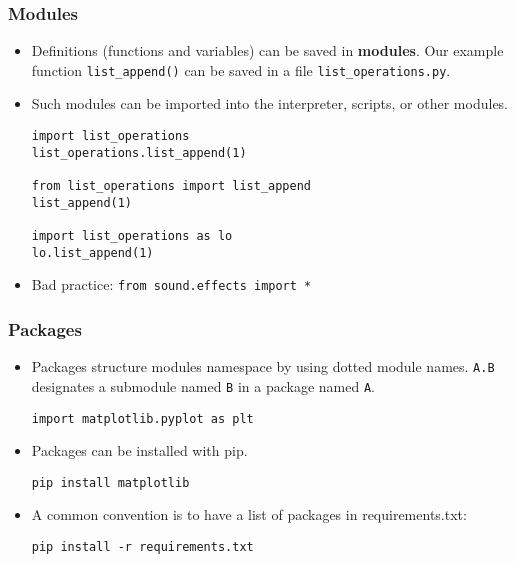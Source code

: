 \begin{frame}[fragile]
    \frametitle{Modules}
    \begin{itemize}
        \item Definitions (functions and variables) can be saved in
        \textbf{modules}. Our example function
        \texttt{list_append()} can be saved in a file
        \texttt{list_operations.py}.
        \item Such modules can be imported into the interpreter,
        scripts, or other modules.
\begin{verbatim}
import list_operations
list_operations.list_append(1)

from list_operations import list_append
list_append(1)

import list_operations as lo
lo.list_append(1)
\end{verbatim}
        \item Bad practice: \texttt{from sound.effects import *}
    \end{itemize}
\end{frame}

\begin{frame}
    \frametitle{Packages}
    \begin{itemize}
        \item Packages structure modules namespace by using dotted
        module names. \texttt{A.B} designates a submodule
        named \texttt{B} in a package named
        \texttt{A}.
\begin{verbatim}
import matplotlib.pyplot as plt
\end{verbatim}
        \item Packages can be installed with pip.
\begin{verbatim}
pip install matplotlib
\end{verbatim}
        \item A common convention is to have a list of packages in requirements.txt:
\begin{verbatim}
pip install -r requirements.txt
\end{verbatim}
    \end{itemize}
\end{frame}

